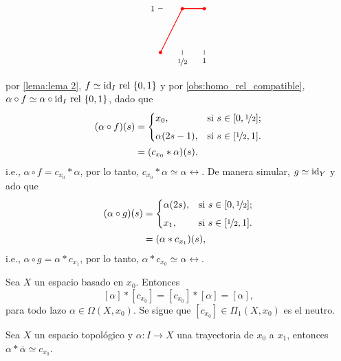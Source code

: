 \begin{dem}
\begin{align*}
{{\begin{tikzpicture}[scale=1.6]
        \draw (0.5, 1.5pt) -- (0.5, -1.5pt) node[below, font=\footnotesize] {$\nicefrac{1}{2}$};
        \draw (1, 1.5pt) -- (1, -1.5pt) node[below, font=\footnotesize] {$1$};
        \draw (1.5pt, 1) -- (-1.5pt, 1) node[left, font=\footnotesize] {$1$};
        \draw[thick, red] (0,0) -- (0.5,1) -- (1,1);
        \filldraw[red] (0,0) circle (1pt);
        \filldraw[red] (0.5,1) circle (1pt);
        \filldraw[red] (1,1) circle (1pt);
    \end{tikzpicture}
    }}
\end{align*}
        por \ref{lema:lema 2}, $f\simeq \mathrm{id}_I\mathrm{\ rel\ } \{0,1\}$ y por \ref{obs:homo_rel_compatible}, $\alpha\circ f\simeq \alpha\circ\mathrm{id}_I\mathrm{\ rel\ } \{0,1\}$, dado que 
        \begin{align*}
            (\alpha\circ f)(s)&=
            \begin{cases} 
        x_0, & \text{si } s\in [0,\nicefrac{1}{2}]; \\[1ex]
        \alpha(2s-1), & \text{si } s \in [\nicefrac{1}{2},1].
    \end{cases}\\
    &=(c_{x_0}*\alpha)(s),
        \end{align*}
        i.e., $\alpha\circ f=c_{x_0}*\alpha$, por lo tanto, $c_{x_0}*\alpha\simeq\alpha\rel$. De manera simular, $g\simeq \mathrm{id}_Y$ y ado que 
        \begin{align*}
            (\alpha\circ g)(s)&=
            \begin{cases} 
        \alpha(2s), & \text{si } s\in [0,\nicefrac{1}{2}]; \\[1ex]
        x_1, & \text{si } s \in [\nicefrac{1}{2},1].
    \end{cases}\\
    &=(\alpha*c_{x_1})(s),
        \end{align*}
    i.e.,  $\alpha\circ g=\alpha*c_{x_1}$, por lo tanto, $\alpha*c_{x_0}\simeq\alpha\rel$.
    \end{dem}
    \begin{coro}
        Sea $X$ un espacio basado en $x_0$. Entonces
        \[
        [\alpha]*[c_{x_0}]=[c_{x_0}]*[\alpha]=[\alpha],
        \]
        para todo lazo $\alpha\in\Omega(X,x_0)$. Se sigue que $[c_{x_0}]\in\Pi_1(X,x_0)$ es el neutro.
    \end{coro}
    \begin{lema}
        Sea $X$ un espacio topológico y $\alpha:I\to X$ una trayectoria de $x_0$ a $x_1$, entonces $\alpha*\overline{\alpha}\simeq c_{x_0}$.
    \end{lema}
